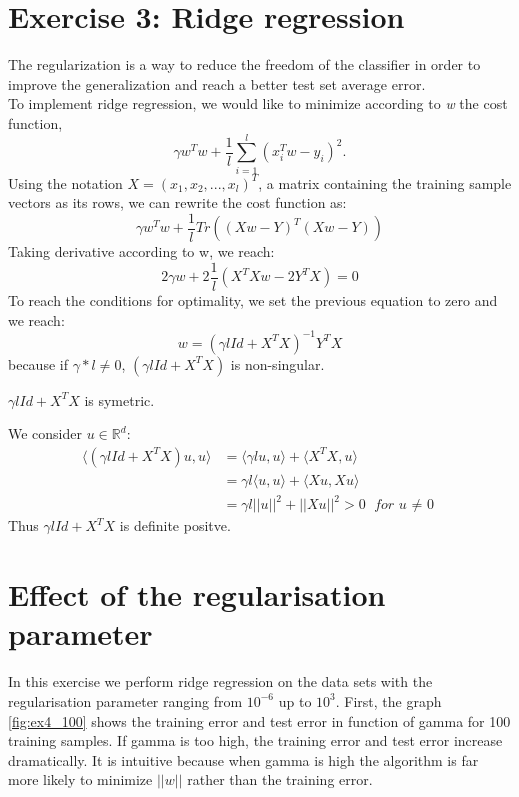 \documentclass{article} %
\begin{document}
\section{Exercise 3: Ridge regression}

The regularization is a way to reduce the freedom of the classifier in order to improve the generalization and reach a better test set average error. 
\\ To implement ridge regression, we would like to minimize according to \textit{w} the cost function, 
\begin{equation*}
\gamma w^{T}w + \frac{1}{l} \sum_{i=1}^{l}(x_{i}^{T}w - y_{i})^{2}.
\end{equation*}
Using the notation $X=(x_{1}, x_{2},...,x_{l})^{T}$, a matrix containing the training sample vectors as its rows, we can rewrite the cost function as: 
\begin{equation*}
\gamma w^{T} w + \frac{1}{l} Tr((Xw - Y)^{T}(Xw - Y))
\end{equation*}
Taking derivative according to w, we reach: 
\begin{equation}
2\gamma w + 2 \frac{1}{l} (X^{T}Xw - 2Y^{T}X)=0
\end{equation}
To reach the conditions for optimality, we set the previous equation to zero and we reach: 
\begin{equation}
w=(\gamma l Id +X^{T}X)^{-1}Y^{T}X
\end{equation}
because if $\gamma*l \ne 0$, $(\gamma l Id +X^{T}X)$ is non-singular.

$\gamma l Id +X^{T}X $ is symetric.

We consider $u \in \mathbb{R}^{d}$:
\begin{align*}
\langle (\gamma l Id +X^{T}X)u,u \rangle &= \langle \gamma l u,u \rangle + \langle X^{T}X,u \rangle
\\  &= \gamma l \langle  u,u \rangle + \langle X u, X u \rangle
\\ &= \gamma l ||u||^{2} + ||Xu||^{2} > 0 \textit{ for u $\ne$ 0}
\end{align*}
Thus $\gamma l Id +X^{T}X$ is definite positve. 

\section{Effect of the regularisation parameter}
In this exercise we perform ridge regression on the data sets with the regularisation parameter ranging from $10^{-6}$ up to $10^3$.
First, the graph \ref{fig:ex4_100} shows the training error and test error in function of gamma for 100 training samples. If gamma is too high, the training error and test error increase dramatically. It is intuitive because when gamma is high the algorithm is far more likely to minimize $||w||$  rather than the training error.
\end{document}
